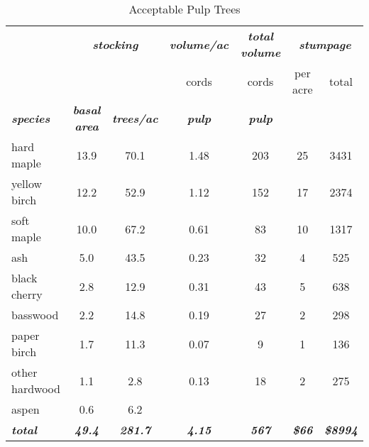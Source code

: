 \documentclass[landscape]{article}
\begin{document}
\begin{table}[H]

\caption{\label{tab:unnamed-chunk-63}Acceptable Pulp Trees}
\fontsize{10}{12}\selectfont
\begin{tabular}[t]{lcccccc}
\toprule
\multicolumn{1}{c}{\em{\textbf{ }}} & \multicolumn{2}{c}{\em{\textbf{stocking}}} & \multicolumn{1}{c}{\em{\textbf{volume/ac }}} & \multicolumn{1}{c}{\em{\textbf{total volume}}} & \multicolumn{2}{c}{\em{\textbf{stumpage}}} \\
\cmidrule(l{3pt}r{3pt}){2-3} \cmidrule(l{3pt}r{3pt}){4-4} \cmidrule(l{3pt}r{3pt}){5-5} \cmidrule(l{3pt}r{3pt}){6-7}
\multicolumn{3}{c}{ } & \multicolumn{1}{c}{cords} & \multicolumn{1}{c}{cords} & \multicolumn{1}{c}{per acre} & \multicolumn{1}{c}{total} \\
\cmidrule(l{3pt}r{3pt}){4-4} \cmidrule(l{3pt}r{3pt}){5-5} \cmidrule(l{3pt}r{3pt}){6-6} \cmidrule(l{3pt}r{3pt}){7-7}
\rowcolor[HTML]{DCDCDC}  \em{\textbf{species}} & \em{\textbf{basal area}} & \em{\textbf{trees/ac}} & \em{\textbf{pulp}} & \em{\textbf{pulp}} & \em{\textbf{ }} & \em{\textbf{ }}\\
\midrule
\rowcolor{gray!6}  hard maple & 13.9 & 70.1 & 1.48 & 203 & 25 & 3431\\
 
yellow birch & 12.2 & 52.9 & 1.12 & 152 & 17 & 2374\\
 
\rowcolor{gray!6}  soft maple & 10.0 & 67.2 & 0.61 & 83 & 10 & 1317\\
 
ash & 5.0 & 43.5 & 0.23 & 32 & 4 & 525\\
 
\rowcolor{gray!6}  black cherry & 2.8 & 12.9 & 0.31 & 43 & 5 & 638\\
 
basswood & 2.2 & 14.8 & 0.19 & 27 & 2 & 298\\
 
\rowcolor{gray!6}  paper birch & 1.7 & 11.3 & 0.07 & 9 & 1 & 136\\
 
other hardwood & 1.1 & 2.8 & 0.13 & 18 & 2 & 275\\
 
\rowcolor{gray!6}  aspen & 0.6 & 6.2 &  &  &  & \\
 
\rowcolor[HTML]{DCDCDC}  \em{\textbf{total}} & \em{\textbf{49.4}} & \em{\textbf{281.7}} & \em{\textbf{4.15}} & \em{\textbf{567}} & \em{\textbf{\$66}} & \em{\textbf{\$8994}}\\
\bottomrule
\end{tabular}
\end{table}
\end{document}
